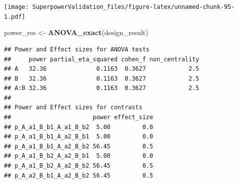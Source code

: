 \documentclass[]{book}
\newenvironment{Shaded}{\begin{snugshade}}{\end{snugshade}}
\newcommand{\CommentTok}[1]{\textcolor[rgb]{0.56,0.35,0.01}{\textit{#1}}}
\newcommand{\DataTypeTok}[1]{\textcolor[rgb]{0.13,0.29,0.53}{#1}}
\newcommand{\DecValTok}[1]{\textcolor[rgb]{0.00,0.00,0.81}{#1}}
\newcommand{\FloatTok}[1]{\textcolor[rgb]{0.00,0.00,0.81}{#1}}
\newcommand{\KeywordTok}[1]{\textcolor[rgb]{0.13,0.29,0.53}{\textbf{#1}}}
\newcommand{\NormalTok}[1]{#1}
\newcommand{\OperatorTok}[1]{\textcolor[rgb]{0.81,0.36,0.00}{\textbf{#1}}}
\newcommand{\StringTok}[1]{\textcolor[rgb]{0.31,0.60,0.02}{#1}}
\begin{document}
\begin{Shaded}
\end{Shaded}

\texttt{[image: SuperpowerValidation\_files/figure-latex/unnamed-chunk-95-1.pdf]}

\begin{Shaded}
\begin{Highlighting}[]
\NormalTok{power_res <-}\StringTok{ }\KeywordTok{ANOVA_exact}\NormalTok{(design_result)}
\end{Highlighting}
\end{Shaded}

\begin{verbatim}
## Power and Effect sizes for ANOVA tests
##     power partial_eta_squared cohen_f non_centrality
## A   32.36              0.1163  0.3627            2.5
## B   32.36              0.1163  0.3627            2.5
## A:B 32.36              0.1163  0.3627            2.5
## 
## Power and Effect sizes for contrasts
##                       power effect_size
## p_A_a1_B_b1_A_a1_B_b2  5.00         0.0
## p_A_a1_B_b1_A_a2_B_b1  5.00         0.0
## p_A_a1_B_b1_A_a2_B_b2 56.45         0.5
## p_A_a1_B_b2_A_a2_B_b1  5.00         0.0
## p_A_a1_B_b2_A_a2_B_b2 56.45         0.5
## p_A_a2_B_b1_A_a2_B_b2 56.45         0.5
\end{verbatim}

\begin{Shaded}
\end{Shaded}
\end{document}
